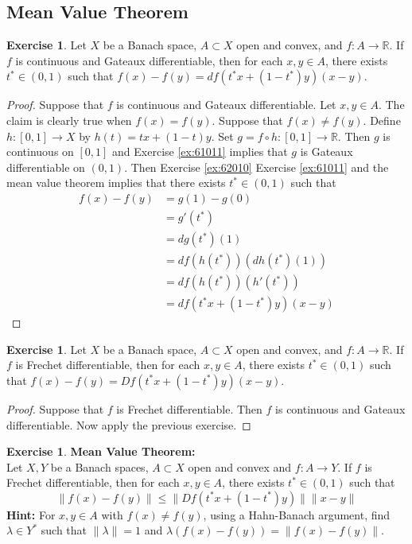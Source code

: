 \documentclass[12pt]{amsart}
\theoremstyle{definition}
\newtheorem{ex}[definition]{Exercise}
\newcommand{\lam}{\lambda}
\newcommand{\R}{\mathbb{R}}
\newcommand{\lex}[1]{\label{ex:#1}}
\newcommand{\rex}[1]{Exercise \ref{ex:#1}}
\begin{document}
	
	
	
	
	
	
	\newpage
	\subsection{Mean Value Theorem}	
	
	\begin{ex} \lex{64001}
	Let $X$ be a Banach space, $A \subset X$ open and convex, and $f:A \rightarrow \R$. If $f$ is continuous and Gateaux differentiable, then for each $x,y \in A$, there exists $t^* \in (0,1)$ such that $f(x) - f(y) = df(t^*x + (1-t^*)y)(x - y)$. 
	\end{ex}
	
	\begin{proof}
	Suppose that $f$ is continuous and Gateaux differentiable. Let $x,y \in A$. The claim is clearly true when $f(x) = f(y)$. Suppose that $f(x) \neq f(y)$. Define $h: [0,1] \rightarrow X$ by $h(t) = tx +(1-t)y$. Set $g = f \circ h: [0,1] \rightarrow \R$. Then $g$ is continuous on $[0,1]$ and \rex{61011} implies that $g$ is Gateaux differentiable on $(0,1)$. Then \rex{62010} \rex{61011} and the mean value theorem implies that there exists $t^* \in (0,1)$ such that
	\begin{align*}
	f(x) - f(y)
	&= g(1) - g(0) \\
	&=g'(t^*) \\ 
	&= dg(t^*)(1) \\
	&= df(h(t^*))(dh(t^*)(1)) \\
	&= df(h(t^*))(h'(t^*)) \\
	&= df(t^*x + (1-t^*)y)(x -y)
	\end{align*}
	\end{proof}
	
	\begin{ex} \lex{64002}
	Let $X$ be a Banach space, $A \subset X$ open and convex, and $f:A \rightarrow \R$. If $f$ is Frechet differentiable, then for each $x,y \in A$, there exists $t^* \in (0,1)$ such that $f(x) - f(y) = Df(t^*x + (1-t^*)y)(x - y)$. 
	\end{ex}
	
	\begin{proof}
	Suppose that $f$ is Frechet differentiable. Then $f$ is continuous and Gateaux differentiable. Now apply the previous exercise.	
	\end{proof}
	
	\begin{ex} \lex{64003}\textbf{Mean Value Theorem:}\\
	Let $X, Y$ be a Banach spaces, $A \subset X$ open and convex and $f:A \rightarrow Y$. If $f$ is Frechet differentiable, then for each $x,y \in A$, there exists $t^* \in (0,1)$ such that $$\|f(x) - f(y)\| \leq \|Df(t^*x + (1-t^*)y)\|\|x-y\|$$
	\textbf{Hint:} For $x,y \in A$ with $f(x) \neq f(y)$, using a Hahn-Banach argument, find $\lam \in Y^*$ such that $\|\lam\| = 1 $ and $\lam (f(x) - f(y)) = \|f(x) - f(y)\|$.
	\end{ex}
	
\end{document}
